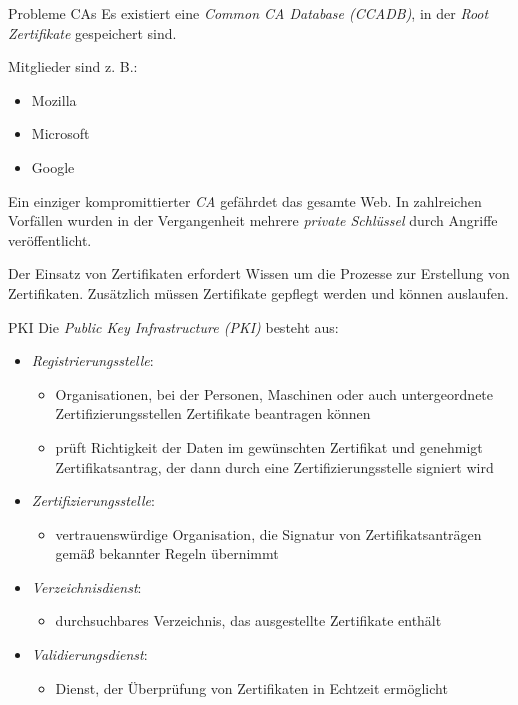 \begin{bonus}{Probleme CAs}
    Es existiert eine \emph{Common CA Database (CCADB)}, in der \emph{Root Zertifikate} gespeichert sind.

    Mitglieder sind z. B.:
    \begin{itemize}
        \item Mozilla
        \item Microsoft
        \item Google
    \end{itemize}

    Ein einziger kompromittierter \emph{CA} gefährdet das gesamte Web.
    In zahlreichen Vorfällen wurden in der Vergangenheit mehrere \emph{private Schlüssel} durch Angriffe veröffentlicht.

    Der Einsatz von Zertifikaten erfordert Wissen um die Prozesse zur Erstellung von Zertifikaten.
    Zusätzlich müssen Zertifikate gepflegt werden und können auslaufen.
\end{bonus}

\begin{bonus}{PKI}
    Die \emph{Public Key Infrastructure (PKI)} besteht aus:
    \begin{itemize}
        \item \emph{Registrierungsstelle}:
              \begin{itemize}
                  \item Organisationen, bei der Personen, Maschinen oder auch untergeordnete Zertifizierungsstellen Zertifikate beantragen können
                  \item prüft Richtigkeit der Daten im gewünschten Zertifikat und genehmigt Zertifikatsantrag, der dann durch eine Zertifizierungsstelle signiert wird
              \end{itemize}
        \item \emph{Zertifizierungsstelle}:
              \begin{itemize}
                  \item vertrauenswürdige Organisation, die Signatur von Zertifikatsanträgen gemäß bekannter Regeln übernimmt
              \end{itemize}
        \item \emph{Verzeichnisdienst}:
              \begin{itemize}
                  \item durchsuchbares Verzeichnis, das ausgestellte Zertifikate enthält
              \end{itemize}
        \item \emph{Validierungsdienst}:
              \begin{itemize}
                  \item Dienst, der Überprüfung von Zertifikaten in Echtzeit ermöglicht
              \end{itemize}
    \end{itemize}
\end{bonus}


